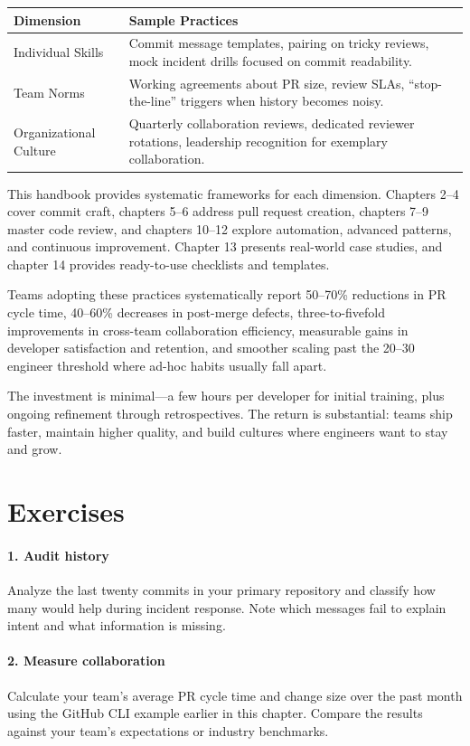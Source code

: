 \begin{longtable}{p{}p{}}
\toprule
\textbf{Dimension} & \textbf{Sample Practices} \\
\midrule
Individual Skills & Commit message templates, pairing on tricky reviews, mock incident drills focused on commit readability. \\
Team Norms & Working agreements about PR size, review SLAs, ``stop-the-line'' triggers when history becomes noisy. \\
Organizational Culture & Quarterly collaboration reviews, dedicated reviewer rotations, leadership recognition for exemplary collaboration. \\
\bottomrule
\end{longtable}

This handbook provides systematic frameworks for each dimension. Chapters 2--4 cover commit craft, chapters 5--6 address pull request creation, chapters 7--9 master code review, and chapters 10--12 explore automation, advanced patterns, and continuous improvement. Chapter 13 presents real-world case studies, and chapter 14 provides ready-to-use checklists and templates.

Teams adopting these practices systematically report 50--70\% reductions in PR cycle time, 40--60\% decreases in post-merge defects, three-to-fivefold improvements in cross-team collaboration efficiency, measurable gains in developer satisfaction and retention, and smoother scaling past the 20--30 engineer threshold where ad-hoc habits usually fall apart.

The investment is minimal---a few hours per developer for initial training, plus ongoing refinement through retrospectives. The return is substantial: teams ship faster, maintain higher quality, and build cultures where engineers want to stay and grow.

\section*{Exercises}

\paragraph{1. Audit history} Analyze the last twenty commits in your primary repository and classify how many would help during incident response. Note which messages fail to explain intent and what information is missing.

\paragraph{2. Measure collaboration} Calculate your team's average PR cycle time and change size over the past month using the GitHub CLI example earlier in this chapter. Compare the results against your team's expectations or industry benchmarks.

